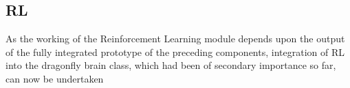 \subsection{RL}

As the working of the Reinforcement Learning module depends upon the output of the fully integrated prototype of the preceding components, integration of RL into the dragonfly brain class, which had been of secondary importance so far, can now be undertaken \label{RL}